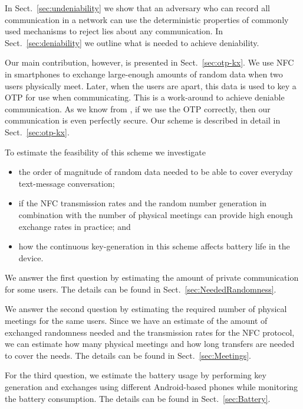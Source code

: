 In Sect.~\ref{sec:undeniability} we show that an adversary who can record all 
communication in a network can use the deterministic properties of commonly 
used mechanisms to reject lies about any communication.
In Sect.~\ref{sec:deniability} we outline what is needed to achieve 
deniability.

Our main contribution, however, is presented in Sect.~\ref{sec:otp-kx}.
We use \ac{NFC} in smartphones to exchange large-enough amounts of random data 
when two users physically meet.
Later, when the users are apart, this data is used to key a \ac{OTP} for use 
when communicating.
This is a work-around to achieve deniable communication.
As we know from \citet{ShannonSecrecy}, if we use the \ac{OTP} correctly, then 
our communication is even perfectly secure.
Our scheme is described in detail in Sect.~\ref{sec:otp-kx}.

To estimate the feasibility of this scheme we investigate
\begin{itemize}
  \item the order of magnitude of random data needed to be able to cover 
    everyday text-message conversation;

  \item if the \ac{NFC} transmission rates and the random number generation in 
    combination with the number of physical meetings can provide high enough 
    exchange rates in practice; and

  \item how the continuous key-generation in this scheme affects battery life 
    in the device.
\end{itemize}

We answer the first question by estimating the amount of private communication 
for some users.
The details can be found in Sect.~\ref{sec:NeededRandomness}.

We answer the second question by estimating the required number of physical 
meetings for the same users.
Since we have an estimate of the amount of exchanged randomness needed and the 
transmission rates for the \ac{NFC} protocol, we can estimate how many physical 
meetings and how long transfers are needed to cover the needs.
The details can be found in Sect.~\ref{sec:Meetings}.

For the third question, we estimate the battery usage by performing key 
generation and exchanges using different Android-based phones while monitoring 
the battery consumption.
The details can be found in Sect.~\ref{sec:Battery}.

